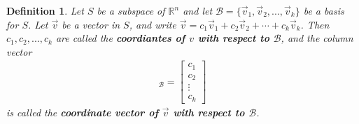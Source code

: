 \documentclass{article}
\theoremstyle{sltheorem}
\newtheorem{definition}{Definition}[section]
\begin{document}
\begin{definition}
    Let $S$ be a subspace of $\mathbb{R}^n$ and let $\mathcal{B}=\{\vec v_1, \vec v_2, ..., \vec v_k\}$ be a basis for $S$. Let $\vec v$ be a vector in $S$, and write $\vec v = c_1\vec v_1 + c_2\vec v_2 + \cdots + c_k\vec v_k$. Then $c_1, c_2, ..., c_k$ are called the \textbf{coordiantes of $v$ with respect to $\mathcal{B}$}, and the column vector
    \begin{gather*}
        [\vec v]_\mathcal{B} = \begin{bmatrix}
            c_1\\c_2\\\vdots\\c_k
        \end{bmatrix}
    \end{gather*}
    is called the \textbf{coordinate vector of $\vec v$ with respect to $\mathcal{B}$}.
\end{definition}
\setcounter{subsection}{5}
\end{document}
